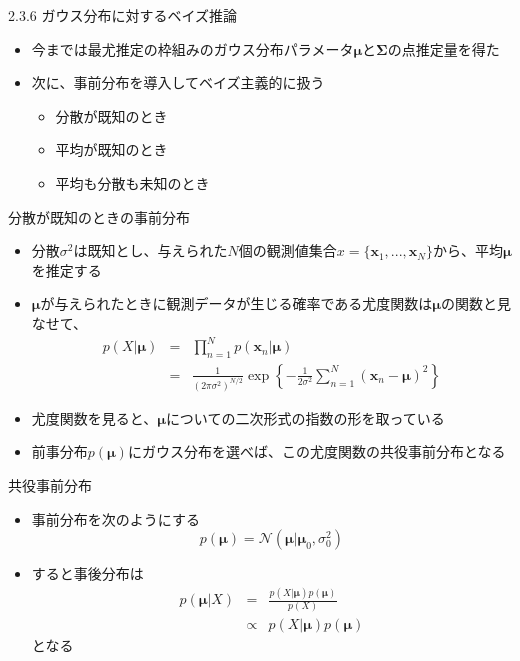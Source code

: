 \begin{frame}{2.3.6 ガウス分布に対するベイズ推論}
 \begin{itemize}
  \item 今までは最尤推定の枠組みのガウス分布パラメータ$\bm{\mu}$と$\bm{\Sigma}$の点推定量を得た
  \item 次に、事前分布を導入してベイズ主義的に扱う
        \begin{itemize}
         \item 分散が既知のとき
         \item 平均が既知のとき
         \item 平均も分散も未知のとき
        \end{itemize}
 \end{itemize}
\end{frame}

\begin{frame}{分散が既知のときの事前分布}
 \begin{itemize}
  \item \alert{分散$\sigma^2$は既知}とし、与えられた$N$個の観測値集合$x=\{\bm{x}_1,...,\bm{x}_N\}$から、平均$\bm{\mu}$を推定する
  \item $\bm{\mu}$が与えられたときに観測データが生じる確率である尤度関数は$\bm{\mu}$の関数と見なせて、
        \begin{eqnarray*}
         p(X|\bm{\mu}) &= &\prod_{n=1}^{N}p(\bm{x}_n|\bm{\mu}) \\
         &=& \frac{1}{(2\pi\sigma^2)^{N/2}}\exp\left\{-\frac{1}{2\sigma^2}\sum_{n=1}^{N}(\bm{x}_n-\bm{\mu})^2\right\}
        \end{eqnarray*}
  \item 尤度関数を見ると、$\bm{\mu}$についての二次形式の指数の形を取っている
  \item 前事分布$p(\bm{\mu})$にガウス分布を選べば、この尤度関数の共役事前分布となる
 \end{itemize}
\end{frame}

\begin{frame}{共役事前分布}
 \begin{itemize}

  \item 事前分布を次のようにする
        \begin{equation}
         p(\bm{\mu}) = \mathcal{N}(\bm{\mu}|\bm{\mu}_0,\sigma_0^2)
        \end{equation}
  \item すると事後分布は
        \begin{eqnarray}
         p(\bm{\mu}|X)&=&\frac{p(X|\bm{\mu})p(\bm{\mu})}{p(X)} \nonumber \\
         &\propto &p(X|\bm{\mu})p(\bm{\mu})
        \end{eqnarray}
        となる
 \end{itemize}
\end{frame}

